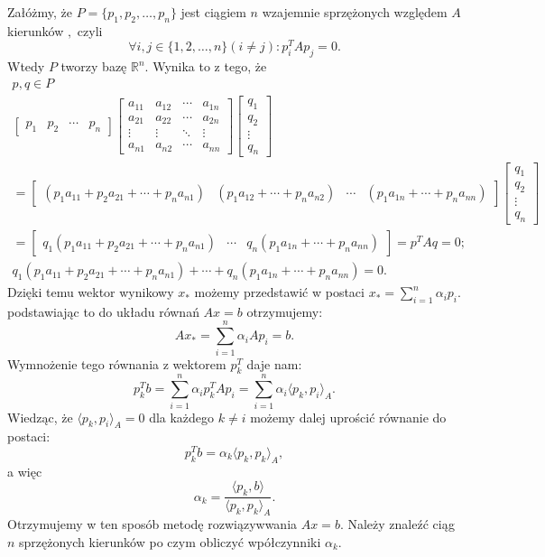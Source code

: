 \documentclass[a4paper,12pt]{book} %
\begin{document}
Załóżmy, że $P = \{p_1, p_2, \ldots, p_n\}$ jest ciągiem $n$ wzajemnie sprzężonych względem $A$ kierunków $,$ czyli 
$$\forall i, j \in \{ 1, 2, \ldots, n\} (i\neq j): p_i^TAp_j = 0 .$$
Wtedy $P$ tworzy bazę $\mathbb{R}^n$. Wynika to z tego, że
\begin{gather*}
p, q \in P \\
\begin{bmatrix}
p_1 & p_2 & \cdots & p_n
\end{bmatrix}
\begin{bmatrix}
a_{11} & a_{12} & \cdots & a_{1n} \\
a_{21} & a_{22} & \cdots & a_{2n} \\
\vdots & \vdots & \ddots & \vdots \\
a_{n1} & a_{n2} & \cdots & a_{nn}
\end{bmatrix}
\begin{bmatrix}
q_1 \\
q_2 \\
\vdots \\
q_n
\end{bmatrix}
\\
=
\begin{bmatrix}
(p_1a_{11} + p_2a_{21} + \cdots + p_na_{n1}) & (p_1a_{12} + \cdots + p_na_{n2}) & \cdots & (p_1a_{1n} + \cdots + p_na_{nn})
\end{bmatrix}
\begin{bmatrix}
q_1 \\
q_2 \\
\vdots \\
q_n
\end{bmatrix}
\\
= 
\begin{bmatrix}
q_1(p_1a_{11} + p_2a_{21} + \cdots + p_na_{n1}) & \cdots & q_n(p_1a_{1n} + \cdots + p_na_{nn})
\end{bmatrix}
= p^TAq = 0;
\\
q_1(p_1a_{11} + p_2a_{21} + \cdots + p_na_{n1}) + \cdots + q_n(p_1a_{1n} + \cdots + p_na_{nn}) = 0.
\end{gather*}
Dzięki temu wektor wynikowy $x_*$ możemy przedstawić w postaci $x_* = \sum_{i=1}^n\alpha_ip_i.$ podstawiając to do układu równań $Ax = b$ otrzymujemy:
$$ Ax_* = \sum^n_{i=1}\alpha_iAp_i = b. $$ Wymnożenie tego równania z wektorem $p_k^T$ daje nam:
$$p_k^Tb = \sum_{i=1}^n\alpha_ip_k^TAp_i = \sum_{i=1}^n\alpha_i\langle p_k, p_i\rangle_A.$$
Wiedząc, że $\langle p_k, p_i \rangle_A = 0$ dla każdego $k \neq i$ możemy dalej uprościć równanie do postaci:
$$p_k^Tb = \alpha_k\langle p_k, p_k\rangle_A,$$ 
a więc
$$ \alpha_k = \frac{\langle p_k, b \rangle }{\langle p_k, p_k \rangle_A}. $$
Otrzymujemy w ten sposób metodę rozwiązywwania $Ax = b.$ Należy znaleźć ciąg $n$ sprzężonych kierunków po czym obliczyć wpółczynniki $\alpha_k.$
\end{document}

